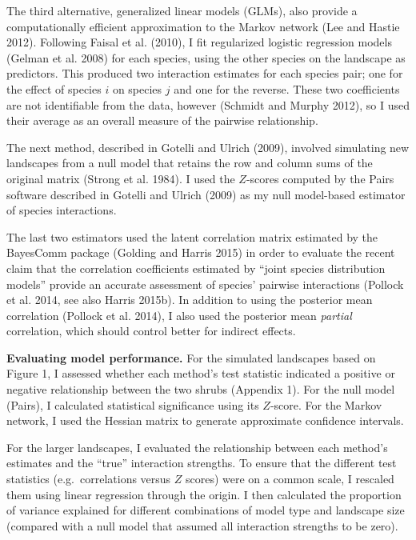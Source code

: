\documentclass[12pt,]{article}
\begin{document}
\begin{spacing}{1.9}
\begin{flushleft}
The third alternative, generalized linear models (GLMs), also provide a
computationally efficient approximation to the Markov network (Lee and
Hastie 2012). Following Faisal et al. (2010), I fit regularized logistic
regression models (Gelman et al. 2008) for each species, using the other
species on the landscape as predictors. This produced two interaction
estimates for each species pair; one for the effect of species \(i\) on
species \(j\) and one for the reverse. These two coefficients are not
identifiable from the data, however (Schmidt and Murphy 2012), so I used
their average as an overall measure of the pairwise relationship.

The next method, described in Gotelli and Ulrich (2009), involved
simulating new landscapes from a null model that retains the row and
column sums of the original matrix (Strong et al. 1984). I used the
\(Z\)-scores computed by the Pairs software described in Gotelli and
Ulrich (2009) as my null model-based estimator of species interactions.

The last two estimators used the latent correlation matrix estimated by
the BayesComm package (Golding and Harris 2015) in order to evaluate the
recent claim that the correlation coefficients estimated by ``joint
species distribution models'' provide an accurate assessment of species'
pairwise interactions (Pollock et al. 2014, see also Harris 2015b). In
addition to using the posterior mean correlation (Pollock et al. 2014),
I also used the posterior mean \emph{partial} correlation, which should
control better for indirect effects.

\noindent \textbf{Evaluating model performance.} For the simulated
landscapes based on Figure 1, I assessed whether each method's test
statistic indicated a positive or negative relationship between the two
shrubs (Appendix 1). For the null model (Pairs), I calculated
statistical significance using its \(Z\)-score. For the Markov network,
I used the Hessian matrix to generate approximate confidence intervals.

For the larger landscapes, I evaluated the relationship between each
method's estimates and the ``true'' interaction strengths. To ensure
that the different test statistics (e.g.~correlations versus \(Z\)
scores) were on a common scale, I rescaled them using linear regression
through the origin. I then calculated the proportion of variance
explained for different combinations of model type and landscape size
(compared with a null model that assumed all interaction strengths to be
zero).


\end{flushleft}
\end{spacing}
\end{document}
